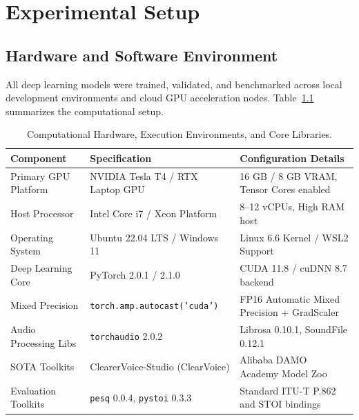 \documentclass[11pt,a4paper]{report}
\begin{document}
\chapter{Experimental Setup}
\label{chap:experimental_setup}

\section{Hardware and Software Environment}
All deep learning models were trained, validated, and benchmarked across local development environments and cloud GPU acceleration nodes. Table~\ref{tab:hardware_specs} summarizes the computational setup.

\begin{table}[H]
\centering
\caption{Computational Hardware, Execution Environments, and Core Libraries.}
\label{tab:hardware_specs}
\small
\begin{tabularx}{\textwidth}{llX}
\toprule
\textbf{Component} & \textbf{Specification} & \textbf{Configuration Details} \\
\midrule
Primary GPU Platform   & NVIDIA Tesla T4 / RTX Laptop GPU & 16 GB / 8 GB VRAM, Tensor Cores enabled \\
Host Processor         & Intel Core i7 / Xeon Platform    & 8--12 vCPUs, High RAM host \\
Operating System       & Ubuntu 22.04 LTS / Windows 11    & Linux 6.6 Kernel / WSL2 Support \\
Deep Learning Core     & PyTorch 2.0.1 / 2.1.0            & CUDA 11.8 / cuDNN 8.7 backend \\
Mixed Precision        & \texttt{torch.amp.autocast('cuda')} & FP16 Automatic Mixed Precision + GradScaler \\
Audio Processing Libs  & \texttt{torchaudio} 2.0.2        & Librosa 0.10.1, SoundFile 0.12.1 \\
SOTA Toolkits          & ClearerVoice-Studio (ClearVoice) & Alibaba DAMO Academy Model Zoo \\
Evaluation Toolkits    & \texttt{pesq} 0.0.4, \texttt{pystoi} 0.3.3 & Standard ITU-T P.862 and STOI bindings \\
\bottomrule
\end{tabularx}
\end{table}
\end{document}
